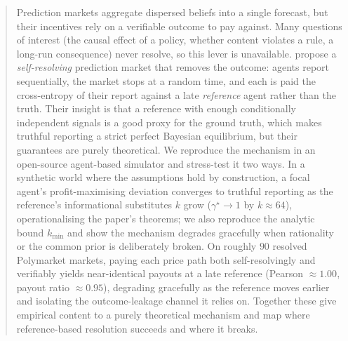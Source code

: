 \begin{abstract}
\noindent
Prediction markets aggregate dispersed beliefs into a single forecast, but their
incentives rely on a verifiable outcome to pay against. Many questions of interest (the
causal effect of a policy, whether content violates a rule, a long-run consequence)
never resolve, so this lever is unavailable. \textcite{srinivasan2025selfresolving}
propose a \emph{self-resolving} prediction market that removes the outcome: agents report
sequentially, the market stops at a random time, and each is paid the cross-entropy of
their report against a late \emph{reference} agent rather than the truth. Their insight is
that a reference with enough conditionally independent signals is a good proxy for the
ground truth, which makes truthful reporting a strict perfect Bayesian equilibrium,
but their guarantees are purely theoretical. We reproduce the mechanism in an open-source
agent-based simulator and stress-test it two ways. In a synthetic world where the
assumptions hold by construction, a focal agent's profit-maximising deviation converges to
truthful reporting as the reference's informational substitutes $k$ grow
($\gamma^\star \to 1$ by $k\approx 64$), operationalising the paper's theorems; we also
reproduce the analytic bound $k_{\min}$ and show the mechanism degrades gracefully when
rationality or the common prior is deliberately broken. On roughly $90$ resolved Polymarket
markets,
paying each price path both self-resolvingly and verifiably yields near-identical payouts
at a late reference (Pearson $\approx 1.00$, payout ratio $\approx 0.95$), degrading
gracefully as the reference moves earlier and isolating the outcome-leakage channel it
relies on. Together these give empirical content to a purely theoretical mechanism and map
where reference-based resolution succeeds and where it breaks.
\end{abstract}
